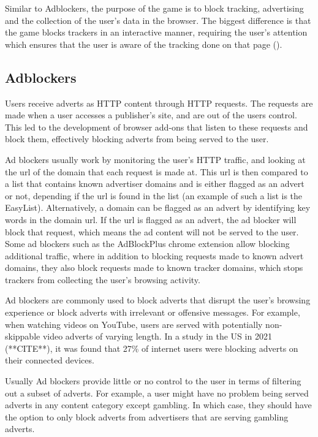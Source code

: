 \documentclass{l4proj}
\begin{document}
Similar to Adblockers, the purpose of the game is to block tracking, advertising and the collection of the user's data in the browser. The biggest difference is that the game blocks trackers in an interactive manner, requiring the user's attention which ensures that the user is aware of the tracking done on that page (\cite{tally}). 

\subsection{Adblockers}
Users receive adverts as HTTP content through HTTP requests. The requests are made when a user accesses a publisher's site, and are out of the users control. This led to the development of browser add-ons that listen to these requests and block them, effectively blocking adverts from being served to the user. 

Ad blockers usually work by monitoring the user's HTTP traffic, and looking at the url of the domain that each request is made at. This url is then compared to a list that contains known advertiser domains and is either flagged as an advert or not, depending if the url is found in the list (an example of such a list is the EasyList). Alternatively, a domain can be flagged as an advert by identifying key words in the domain url. If the url is flagged as an advert, the ad blocker will block that request, which means the ad content will not be served to the user. Some ad blockers such as the AdBlockPlus chrome extension allow blocking additional traffic, where in addition to blocking requests made to known advert domains, they also block requests made to known tracker domains, which stops trackers from collecting the user's browsing activity.

Ad blockers are commonly used to block adverts that disrupt the user's browsing experience or block adverts with irrelevant or offensive messages. For example, when watching videos on YouTube, users are served with potentially non-skippable video adverts of varying length. In a study in the US in 2021 (**CITE**), it was found that 27\% of internet users were blocking adverts on their connected devices. 

Usually Ad blockers provide little or no control to the user in terms of filtering out a subset of adverts. For example, a user might have no problem being served adverts in any content category except gambling. In which case, they should have the option to only block adverts from advertisers that are serving gambling adverts. 
\end{document}
